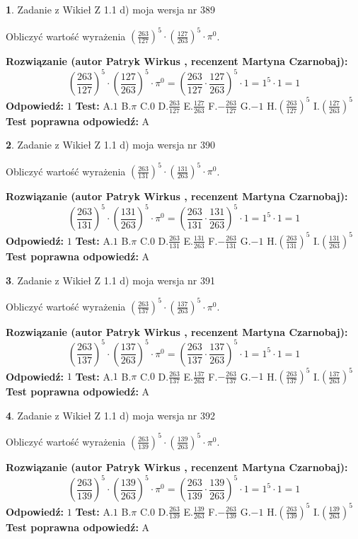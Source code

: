 \documentclass[12pt, a4paper]{article}
\theoremstyle{definition} %
\newtheorem{zad}{}
\newcommand{\zadStart}[1]{\begin{zad}#1\newline}
\newcommand{\zadStop}{\end{zad}}
\newcommand{\rozwStart}[2]{\noindent \textbf{Rozwiązanie (autor #1 , recenzent #2): }\newline}
\newcommand{\rozwStop}{\newline}
\newcommand{\odpStart}{\noindent \textbf{Odpowiedź:}\newline}
\newcommand{\odpStop}{\newline}
\newcommand{\testStart}{\noindent \textbf{Test:}\newline}
\newcommand{\testStop}{\newline}
\newcommand{\kluczStart}{\noindent \textbf{Test poprawna odpowiedź:}\newline}
\newcommand{\kluczStop}{\newline}
\begin{document}
\zadStart{Zadanie z Wikieł Z 1.1 d) moja wersja nr 389}

Obliczyć wartość wyrażenia $(\frac{263}{127})^{5} \cdot (\frac{127}{263})^{5} \cdot \pi^{0}$.
\zadStop
\rozwStart{Patryk Wirkus}{Martyna Czarnobaj}
$$(\frac{263}{127})^{5} \cdot (\frac{127}{263})^{5} \cdot \pi^{0} = (\frac{263}{127} \cdot \frac{127}{263})^{5} \cdot 1 = 1^{5} \cdot 1 = 1$$
\rozwStop
\odpStart
$1$
\odpStop
\testStart
A.$1$ B.$\pi$ C.$0$ D.$\frac{263}{127}$ E.$\frac{127}{263}$
F.$-\frac{263}{127}$ G.$-1$
H.$(\frac{263}{127})^{5}$
I.$(\frac{127}{263})^{5}$
\testStop
\kluczStart
A
\kluczStop



\zadStart{Zadanie z Wikieł Z 1.1 d) moja wersja nr 390}

Obliczyć wartość wyrażenia $(\frac{263}{131})^{5} \cdot (\frac{131}{263})^{5} \cdot \pi^{0}$.
\zadStop
\rozwStart{Patryk Wirkus}{Martyna Czarnobaj}
$$(\frac{263}{131})^{5} \cdot (\frac{131}{263})^{5} \cdot \pi^{0} = (\frac{263}{131} \cdot \frac{131}{263})^{5} \cdot 1 = 1^{5} \cdot 1 = 1$$
\rozwStop
\odpStart
$1$
\odpStop
\testStart
A.$1$ B.$\pi$ C.$0$ D.$\frac{263}{131}$ E.$\frac{131}{263}$
F.$-\frac{263}{131}$ G.$-1$
H.$(\frac{263}{131})^{5}$
I.$(\frac{131}{263})^{5}$
\testStop
\kluczStart
A
\kluczStop



\zadStart{Zadanie z Wikieł Z 1.1 d) moja wersja nr 391}

Obliczyć wartość wyrażenia $(\frac{263}{137})^{5} \cdot (\frac{137}{263})^{5} \cdot \pi^{0}$.
\zadStop
\rozwStart{Patryk Wirkus}{Martyna Czarnobaj}
$$(\frac{263}{137})^{5} \cdot (\frac{137}{263})^{5} \cdot \pi^{0} = (\frac{263}{137} \cdot \frac{137}{263})^{5} \cdot 1 = 1^{5} \cdot 1 = 1$$
\rozwStop
\odpStart
$1$
\odpStop
\testStart
A.$1$ B.$\pi$ C.$0$ D.$\frac{263}{137}$ E.$\frac{137}{263}$
F.$-\frac{263}{137}$ G.$-1$
H.$(\frac{263}{137})^{5}$
I.$(\frac{137}{263})^{5}$
\testStop
\kluczStart
A
\kluczStop



\zadStart{Zadanie z Wikieł Z 1.1 d) moja wersja nr 392}

Obliczyć wartość wyrażenia $(\frac{263}{139})^{5} \cdot (\frac{139}{263})^{5} \cdot \pi^{0}$.
\zadStop
\rozwStart{Patryk Wirkus}{Martyna Czarnobaj}
$$(\frac{263}{139})^{5} \cdot (\frac{139}{263})^{5} \cdot \pi^{0} = (\frac{263}{139} \cdot \frac{139}{263})^{5} \cdot 1 = 1^{5} \cdot 1 = 1$$
\rozwStop
\odpStart
$1$
\odpStop
\testStart
A.$1$ B.$\pi$ C.$0$ D.$\frac{263}{139}$ E.$\frac{139}{263}$
F.$-\frac{263}{139}$ G.$-1$
H.$(\frac{263}{139})^{5}$
I.$(\frac{139}{263})^{5}$
\testStop
\kluczStart
A
\kluczStop
\end{document}
